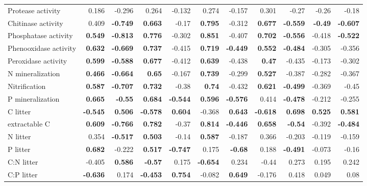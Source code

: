 \documentclass[10pt]{article}
\begin{document}
\begin{flushleft}
\begin{landscape}
\begin{table}[h!]
\begin{center}
{\begin{tabular}{lrrrrrrrrrr}
  Protease activity & 0.186 & -0.296 & 0.264 & -0.132 & 0.274 & -0.157 & 0.301 & -0.27 & -0.26 & -0.18 \\ 
  Chitinase activity & 0.409 & \textbf{-0.749} & \textbf{0.663} & -0.17 & \textbf{0.795} & -0.312 & \textbf{0.677} & \textbf{-0.559} & \textbf{-0.49} & \textbf{-0.607} \\ 
  Phosphatase activity & \textbf{0.549} & \textbf{-0.813} & \textbf{0.776} & -0.302 & \textbf{0.851} & -0.407 & \textbf{0.702} & \textbf{-0.556} & -0.418 & \textbf{-0.522} \\ 
  Phenooxidase activity & \textbf{0.632} & \textbf{-0.669} & \textbf{0.737} & -0.415 & \textbf{0.719} & \textbf{-0.449} & \textbf{0.552} & \textbf{-0.484} & -0.305 & -0.356 \\ 
  Peroxidase activity & \textbf{0.599} & \textbf{-0.588} & \textbf{0.677} & -0.412 & \textbf{0.639} & -0.438 & \textbf{0.47} & -0.435 & -0.173 & -0.302 \\ 
  N mineralization & \textbf{0.466} & \textbf{-0.664} & \textbf{0.65} & -0.167 & \textbf{0.739} & -0.299 & \textbf{0.527} & -0.387 & -0.282 & -0.367 \\ 
  Nitrification & \textbf{0.587} & \textbf{-0.707} & \textbf{0.732} & -0.38 & \textbf{0.74} & -0.432 & \textbf{0.621} & \textbf{-0.499} & -0.369 & -0.45 \\ 
  P mineralization & \textbf{0.665} & \textbf{-0.55} & \textbf{0.684} & \textbf{-0.544} & \textbf{0.596} & \textbf{-0.576} & 0.414 & \textbf{-0.478} & -0.212 & -0.255 \\ 
  C litter & \textbf{-0.545} & \textbf{0.506} & \textbf{-0.578} & \textbf{0.604} & -0.368 & \textbf{0.643} & \textbf{-0.618} & \textbf{0.698} & \textbf{0.525} & \textbf{0.581} \\ 
  extractable C & \textbf{0.609} & \textbf{-0.766} & \textbf{0.782} & -0.37 & \textbf{0.814} & \textbf{-0.446} & \textbf{0.658} & \textbf{-0.54} & -0.392 & \textbf{-0.484} \\ 
  N litter & 0.354 & \textbf{-0.517} & \textbf{0.503} & -0.14 & \textbf{0.587} & -0.187 & 0.366 & -0.203 & -0.119 & -0.159 \\ 
  P litter & \textbf{0.682} & -0.222 & \textbf{0.517} & \textbf{-0.747} & 0.175 & \textbf{-0.68} & 0.188 & \textbf{-0.491} & -0.073 & -0.16 \\ 
  C:N litter & -0.405 & \textbf{0.586} & \textbf{-0.57} & 0.175 & \textbf{-0.654} & 0.234 & -0.44 & 0.273 & 0.195 & 0.242 \\ 
  C:P litter & \textbf{-0.636} & 0.174 & \textbf{-0.453} & \textbf{0.754} & -0.082 & \textbf{0.649} & -0.176 & 0.418 & 0.049 & 0.08 \\ 

\end{tabular}}
\end{center}
\end{table}
\end{landscape}
\end{flushleft}
\end{document}
